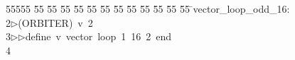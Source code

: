 %
%
\begin{tabbing}
55555 \= 55 \= 55 \= 55 \= 55 \= 55 \= 55 \= 55 \= 55 \= 55 \= 55 \= 55 \= 55 \= \>vector\_loop\_odd\_16:\\[0pt]
2\>$\triangleright$\>(ORBITER)\ v\ 2\ \\[0pt]
3\>$\triangleright$\>$\triangleright$\>define\ v\ vector\ loop\ 1\ 16\ 2\ end\ \\[0pt]
4\>\end{tabbing}

